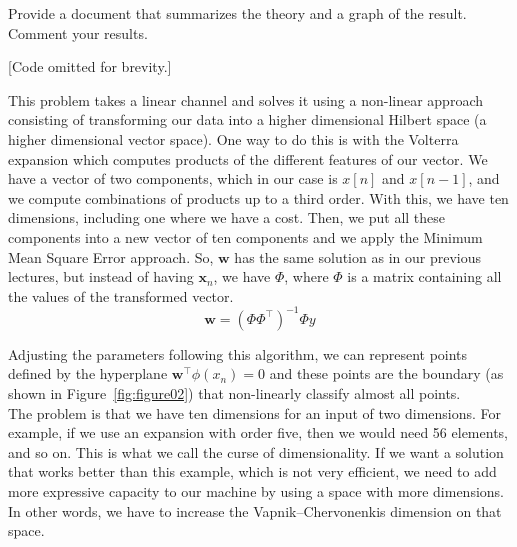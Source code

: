 \documentclass[11pt]{article}
\begin{document}
Provide a document that summarizes the theory and a graph of the result. Comment your results.

[Code omitted for brevity.]




\begin{tcolorbox}[colback=CrispBlue!5!white,colframe=CrispBlue!75!black,title=Primal formulation of a non-linear classifier with MMSE.]

This problem takes a linear channel and solves it using a non-linear approach consisting of transforming our data into a higher dimensional Hilbert space (a higher dimensional vector space). One way to do this is with the Volterra expansion which computes products of the different features of our vector. We have a vector of two components, which in our case is \(x[n]\) and \(x[n-1]\), and we compute combinations of products up to a third order. With this, we have ten dimensions, including one where we have a cost. Then, we put all these components into a new vector of ten components and we apply the Minimum Mean Square Error approach. So, \(\mathbf{w}\) has the same solution as in our previous lectures, but instead of having \(\mathbf{x}_n\), we have \(\Phi\), where \(\Phi\) is a matrix containing all the values of the transformed vector.
\begin{equation}
    \mathbf{w} = (\Phi \Phi ^\top)^{-1} \Phi y
\end{equation}

Adjusting the parameters following this algorithm, we can represent points defined by the hyperplane \( \mathbf{w}^\top \phi (x_n) = 0\) and these points are the boundary (as shown in Figure~\ref{fig:figure02}) that non-linearly classify almost all points.\\

The problem is that we have ten dimensions for an input of two dimensions. For example, if we use an expansion with order five, then we would need 56 elements, and so on. This is what we call the curse of dimensionality. If we want a solution that works better than this example, which is not very efficient, we need to add more expressive capacity to our machine by using a space with more dimensions. In other words, we have to increase the Vapnik--Chervonenkis dimension on that space.

\end{tcolorbox}
\end{document}
